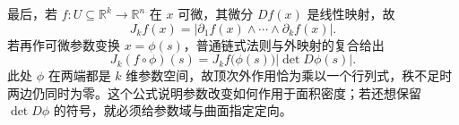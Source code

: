 \ProseParagraphBreak

最后，若 \(f:U\subseteq\mathbb R^k\rightarrow\mathbb R^n\) 在 \(x\) 可微，其微分 \(Df(x)\) 是线性映射，故
\[
 J_kf(x)
 =|\partial_1f(x)\wedge\cdots\wedge\partial_kf(x)|.
\]
若再作可微参数变换 \(x=\phi(s)\)，普通链式法则与外映射的复合给出
\[
 J_k(f\circ\phi)(s)
   =J_kf\bigl(\phi(s)\bigr)|\det D\phi(s)|.
\]
此处 \(\phi\) 在两端都是 \(k\) 维参数空间，故顶次外作用恰为乘以一个行列式，秩不足时两边仍同时为零。这个公式说明参数改变如何作用于面积密度；若还想保留 \(\det D\phi\) 的符号，就必须给参数域与曲面指定定向。
